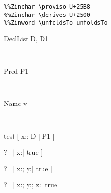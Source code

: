 \begin{verbatim}
%%Zinchar \proviso U+25B8
%%Zinchar \derives U+2500
%%Zinword \unfoldsTo unfoldsTo
\end{verbatim}
\newcommand{\unfoldsTo}{\mathrel{\leadsto}}

\begin{zedjoker}{DeclList} D, D1\end{zedjoker} \\
\begin{zedjoker}{Pred} P1\end{zedjoker} \\
\begin{zedjoker}{Name} v\end{zedjoker} \\

\begin{zedrule}{test}
  [ x:\nat ; D | P1 ]
\end{zedrule}

\begin{zed}
  \vdash?~ [ x:\nat | true ]
\end{zed}

\begin{zed}
  \vdash?~ [ x:\nat; y:\nat | true ]
\end{zed}

\begin{zed}
  \vdash?~ [ x:\nat; y:\nat ; z:\nat | true ]
\end{zed}
